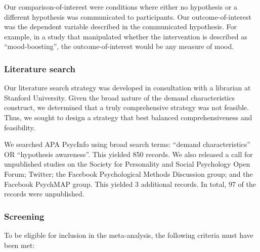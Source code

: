 \documentclass[
  man,floatsintext]{apa6}
\begin{document}
Our comparison-of-interest were conditions where either no hypothesis or a different hypothesis was communicated to participants. Our outcome-of-interest was the dependent variable described in the communicated hypothesis. For example, in a study that manipulated whether the intervention is described as ``mood-boosting'', the outcome-of-interest would be any measure of mood.

\hypertarget{literature-search}{%
\subsubsection{Literature search}\label{literature-search}}

Our literature search strategy was developed in consultation with a librarian at Stanford University. Given the broad nature of the demand characteristics construct, we determined that a truly comprehensive strategy was not feasible. Thus, we sought to design a strategy that best balanced comprehensiveness and feasibility.

We searched APA PsycInfo using broad search terms: ``demand characteristics'' OR ``hypothesis awareness''. This yielded 850 records. We also released a call for unpublished studies on the Society for Personality and Social Psychology Open Forum; Twitter; the Facebook Psychological Methods Discussion group; and the Facebook PsychMAP group. This yielded 3 additional records. In total, 97 of the records were unpublished.

\hypertarget{screening}{%
\subsubsection{Screening}\label{screening}}

To be eligible for inclusion in the meta-analysis, the following criteria must have been met:
\end{document}
